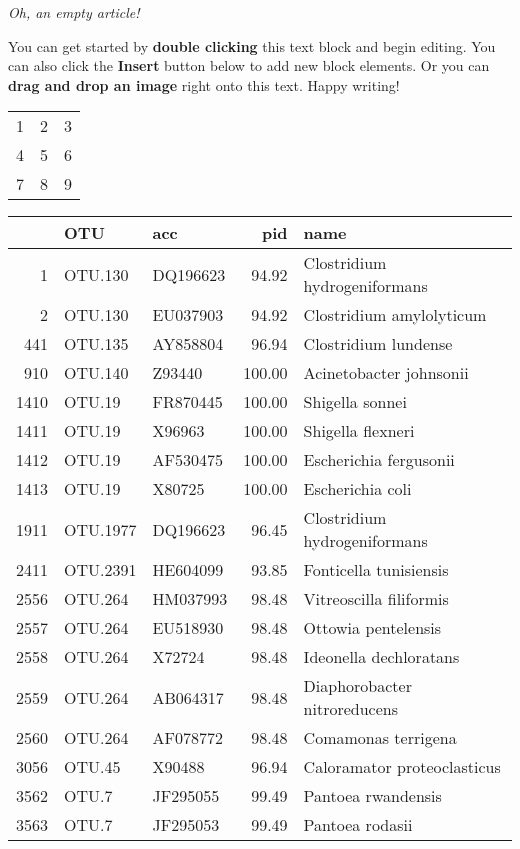 \textit{Oh, an empty article!} 

You can get started by \textbf{double clicking} this text block and begin editing. You can also click the \textbf{Insert} button below to add new block elements. Or you can \textbf{drag and drop an image} right onto this text. Happy writing!

\begin{tabular}{ l c r }
  1 & 2 & 3 \\
  4 & 5 & 6 \\
  7 & 8 & 9 \\
\end{tabular}

\begin{tabular}{rllrl}
  \hline
 & OTU & acc & pid & name \\ 
  \hline
1 & OTU.130 & DQ196623 & 94.92 & Clostridium hydrogeniformans \\ 
  2 & OTU.130 & EU037903 & 94.92 & Clostridium amylolyticum \\ 
  441 & OTU.135 & AY858804 & 96.94 & Clostridium lundense \\ 
  910 & OTU.140 & Z93440 & 100.00 & Acinetobacter johnsonii \\ 
  1410 & OTU.19 & FR870445 & 100.00 & Shigella sonnei \\ 
  1411 & OTU.19 & X96963 & 100.00 & Shigella flexneri \\ 
  1412 & OTU.19 & AF530475 & 100.00 & Escherichia fergusonii \\ 
  1413 & OTU.19 & X80725 & 100.00 & Escherichia coli \\ 
  1911 & OTU.1977 & DQ196623 & 96.45 & Clostridium hydrogeniformans \\ 
  2411 & OTU.2391 & HE604099 & 93.85 & Fonticella tunisiensis \\ 
  2556 & OTU.264 & HM037993 & 98.48 & Vitreoscilla filiformis \\ 
  2557 & OTU.264 & EU518930 & 98.48 & Ottowia pentelensis \\ 
  2558 & OTU.264 & X72724 & 98.48 & Ideonella dechloratans \\ 
  2559 & OTU.264 & AB064317 & 98.48 & Diaphorobacter nitroreducens \\ 
  2560 & OTU.264 & AF078772 & 98.48 & Comamonas terrigena \\ 
  3056 & OTU.45 & X90488 & 96.94 & Caloramator proteoclasticus \\ 
  3562 & OTU.7 & JF295055 & 99.49 & Pantoea rwandensis \\ 
  3563 & OTU.7 & JF295053 & 99.49 & Pantoea rodasii \\ 

\end{tabular}
